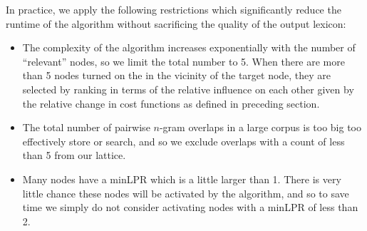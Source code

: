 \documentclass[11pt]{article}
\begin{document}
In practice, we apply the following restrictions which significantly reduce the runtime of the algorithm without sacrificing the quality of the output lexicon:

\begin{itemize}
\item The complexity of the algorithm increases exponentially with the number of ``relevant'' nodes, so we limit the total number to 5. When there are more than 5 nodes turned on the in the vicinity of the target node, they are selected by ranking in terms of the relative influence on each other given by the relative change in cost functions as defined in preceding section.
\item The total number of pairwise $n$-gram overlaps in a large corpus is too big too effectively store or search, and so we exclude overlaps with a count of less than 5 from our lattice.
\item Many nodes have a minLPR which is a little larger than 1. There is very little chance these nodes will be activated by the algorithm, and so to save time we simply do not consider activating nodes with a minLPR of less than 2.
\end{itemize}








\end{document}
